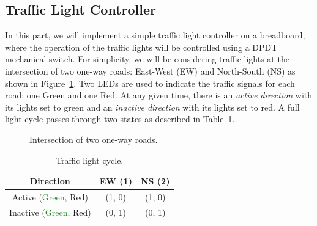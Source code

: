 \subsection{Traffic Light Controller}
\label{sec:voltageDivider}
In this part, we will implement a simple traffic light controller on a breadboard, where the operation of the traffic lights will be controlled using a DPDT mechanical switch. For simplicity, we will be considering traffic lights at the intersection of two one-way roads: East-West (EW) and North-South (NS) as shown in Figure~\ref{fig:intersection}. Two LEDs are used to indicate the traffic signals for each road: one Green and one Red. At any given time, there is an \emph{active direction} with its lights set to green  and an \emph{inactive direction} with its lights set to red. A full light cycle passes through two states as described in Table~\ref{tab:traffic}. %
%
%
%
%
\begin{figure}
  \centering
  \caption{Intersection of two one-way roads.}
  \label{fig:intersection}
\end{figure}

\begin{table}%
\caption{Traffic light cycle.}
\label{tab:traffic}
\centering
\begin{tabular}{c|c|c}
\toprule
Direction & EW (1)  & NS (2)\\
\toprule
Active (\textcolor{ForestGreen}{Green}, \textcolor{BrickRed}{Red}) & (1, 0) & (1, 0)\\
\hline
Inactive (\textcolor{ForestGreen}{Green}, \textcolor{BrickRed}{Red}) & (0, 1) & (0, 1)\\
\bottomrule
\end{tabular}

\end{table}

